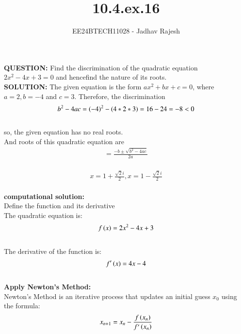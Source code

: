 \documentclass[journal]{IEEEtran}
\begin{document}

\vspace{3cm}
\title{10.4.ex.16}
\author{EE24BTECH11028 - Jadhav Rajesh}
{\let\newpage\relax\maketitle}

\renewcommand{\thefigure}{\theenumi}
\renewcommand{\thetable}{\theenumi}
\setlength{\intextsep}{10pt} %


\renewcommand{\thetable}{\theenumi}
 \textbf{QUESTION:} Find the discrimination of the quadratic equation $2x^{2}-4x+3=0$ and hencefind the nature of its roots.\\
 \textbf{SOLUTION:} The given equation is the form $ax^{2}+bx+c=0$, where $a=2,b=-4$ and $c=3$. Therefore, the discrimination\\
 \begin{align}
     b^{2}-4ac=\left(-4\right)^{2}-\left(4*2*3\right)=16-24=-8 < 0 
 \end{align}\\
 so, the given equation has no real roots.\\ 
 And roots of this quadratic equation are\\
 \begin{align}
     =\frac{-b\pm\sqrt{b^{2}-4ac}}{2a}
 \end{align}\\
 \begin{align}
     x=1+\frac{\sqrt{2}i}{2} , x=1-\frac{\sqrt{2}i}{2}
  \end{align}\\
  \textbf{computational solution:} \\
  Define  the function and its derivative\\
  The quadratic equation is:
  \begin{align}
      f\left(x\right)=2x^{2}-4x+3
  \end{align}\\
  The derivative of the function is:\\
  \begin{align*}
      f'\left(x\right)=4x-4
  \end{align*}\\
  \textbf{Apply Newton's Method:}\\
  Newton's Method is an iterative process that updates an initial guess $x_{0}$ using the formula:\\
  \begin{align}
      x_{n+1}=x_{n}-\frac{f\left(x_{n}\right)}{f'\left(x_{n}\right)}
  \end{align}\\
\end{document}
